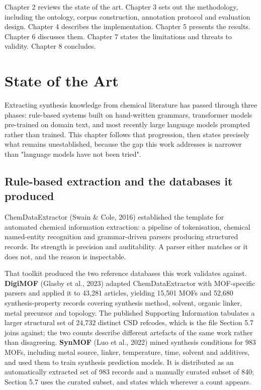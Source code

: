 \documentclass[11pt,a4paper,oneside]{report}
\begin{document}
Chapter 2 reviews the state of the art. Chapter 3 sets out the methodology, including the ontology, corpus construction, annotation protocol and evaluation design. Chapter 4 describes the implementation. Chapter 5 presents the results. Chapter 6 discusses them. Chapter 7 states the limitations and threats to validity. Chapter 8 concludes.


\chapter{State of the Art}


Extracting synthesis knowledge from chemical literature has passed through three phases: rule-based systems built on hand-written grammars, transformer models pre-trained on domain text, and most recently large language models prompted rather than trained. This chapter follows that progression, then states precisely what remains unestablished, because the gap this work addresses is narrower than "language models have not been tried".

\section{Rule-based extraction and the databases it produced}

ChemDataExtractor (Swain \& Cole, 2016) established the template for automated chemical information extraction: a pipeline of tokenisation, chemical named-entity recognition and grammar-driven parsers producing structured records. Its strength is precision and auditability. A parser either matches or it does not, and the reason is inspectable.

That toolkit produced the two reference databases this work validates against. \textbf{DigiMOF} (Glasby et al., 2023) adapted ChemDataExtractor with MOF-specific parsers and applied it to 43,281 articles, yielding 15,501 MOFs and 52,680 synthesis-property records covering synthesis method, solvent, organic linker, metal precursor and topology. The published Supporting Information tabulates a larger structural set of 24,732 distinct CSD refcodes, which is the file Section 5.7 joins against; the two counts describe different artefacts of the same work rather than disagreeing. \textbf{SynMOF} (Luo et al., 2022) mined synthesis conditions for 983 MOFs, including metal source, linker, temperature, time, solvent and additives, and used them to train synthesis prediction models. It is distributed as an automatically extracted set of 983 records and a manually curated subset of 840; Section 5.7 uses the curated subset, and states which wherever a count appears.
\end{document}
